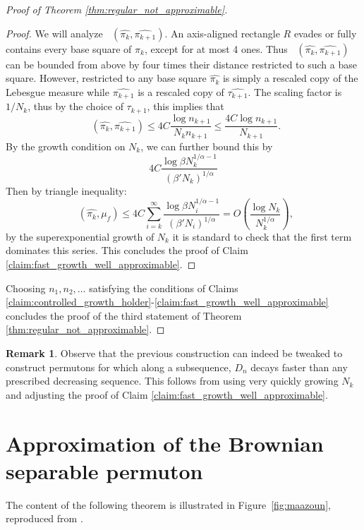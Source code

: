 \documentclass{article}
\newcommand{\ds}{\mathop{d_\square}}
\theoremstyle{definition}
\newtheorem{remark}[theorem]{Remark}
\begin{document}
\begin{proof}[Proof of Theorem \ref{thm:regular_not_approximable}]
    \begin{proof}
        We will analyze $\ds(\widehat{\pi_{k}}, \widehat{\pi_{k+1}})$.
        An axis-aligned rectangle $R$ evades or fully contains every base square of $\pi_k$, except for at most 4 ones. Thus $\ds(\widehat{\pi_{k}}, \widehat{\pi_{k+1}})$ can be bounded from above by four times their distance restricted to such a base square. However, restricted to any base square $\widehat{\pi_k}$ is simply a rescaled copy of the Lebesgue measure while $\widehat{\pi_{k+1}}$ is a rescaled copy of $\widehat{\tau_{k+1}}$. The scaling factor is $1/N_k$, thus by the choice of $\tau_{k+1}$, this implies that
        $$\ds(\widehat{\pi_{k}}, \widehat{\pi_{k+1}})\leq 4C\frac{\log n_{k+1}}{N_kn_{k+1}}\leq \frac{4C\log n_{k+1}}{N_{k+1}}.$$
        By the growth condition on $N_k$, we can further bound this by
        $$4C\frac{\log \beta N_k^{1/\alpha-1}}{(\beta' N_k)^{1/\alpha}}$$
        Then by triangle inequality:
        $$\ds(\widehat{\pi_k}, \mu_f)\leq 4C\sum_{i=k}^{\infty}\frac{\log \beta N_i^{1/\alpha-1}}{(\beta' N_i)^{1/\alpha}}=O\left(\frac{\log N_k}{N_k^{1/\alpha}}\right),$$
        by the superexponential growth of $N_k$ it is standard to check that the first term dominates this series. This concludes the proof of Claim \ref{claim:fast_growth_well_approximable}.
    \end{proof}

    Choosing $n_1, n_2, \dots$ satisfying the conditions of Claims \ref{claim:controlled_growth_holder}-\ref{claim:fast_growth_well_approximable} concludes the proof of the third statement of Theorem \ref{thm:regular_not_approximable}.
\end{proof}

\begin{remark}
    Observe that the previous construction can indeed be tweaked to construct permutons for which along a subsequence, \(D_n\) decays faster than any prescribed decreasing sequence. This follows from using very quickly growing $N_k$ and adjusting the proof of Claim \ref{claim:fast_growth_well_approximable}.
\end{remark}

\section{Approximation of the Brownian separable permuton}\label{sec:brownian_separable}

The content of the following theorem is illustrated in Figure~\ref{fig:maazoun}, reproduced from \cite{Maazoun_2020}.
\end{document}
